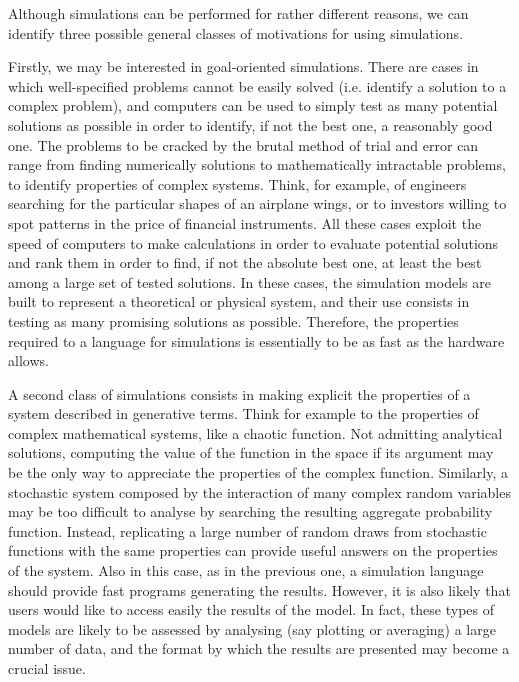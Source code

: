 \documentclass [11pt,a4paper] {book}
\begin{document}
Although simulations can be performed for rather different reasons, we can identify three possible general classes of motivations for using simulations. 

Firstly, we may be interested in goal-oriented simulations. There are cases in which well-specified problems cannot be easily solved (i.e. identify a solution to a complex problem), and computers can be used to simply test as many potential solutions as possible in order to identify, if not the best one, a reasonably good one. The problems to be cracked by the brutal method of trial and error can range from finding numerically solutions to mathematically intractable problems, to identify properties of complex systems. Think, for example, of engineers searching for the particular shapes of an airplane wings, or to investors willing to spot patterns in the price of financial instruments. All these cases exploit the speed of computers to make calculations in order to evaluate potential solutions and rank them in order to find, if not the absolute best one, at least the best among a large set of tested solutions. In these cases, the simulation models are built to represent a theoretical or physical system, and their use consists in testing as many promising solutions as possible. Therefore, the properties required to a language for simulations is essentially to be as fast as the hardware allows.

A second class of simulations consists in making explicit the properties of a system described in generative terms. Think for example to the properties of complex mathematical systems, like a chaotic function. Not admitting analytical solutions, computing the value of the function in the space if its argument may be the only way to appreciate the properties of the complex function. Similarly, a stochastic system composed by the interaction of many complex random variables may be too difficult to analyse by searching the resulting aggregate probability function. Instead, replicating a large number of random draws from stochastic functions with the same properties can provide useful answers on the properties of the system. Also in this case, as in the previous one, a simulation language should provide fast programs generating the results. However, it is also likely that users would like to access easily the results of the model. In fact, these types of models are likely to be assessed by analysing (say plotting or averaging) a large number of data, and the format by which the results are presented may become a crucial issue.
\end{document}
